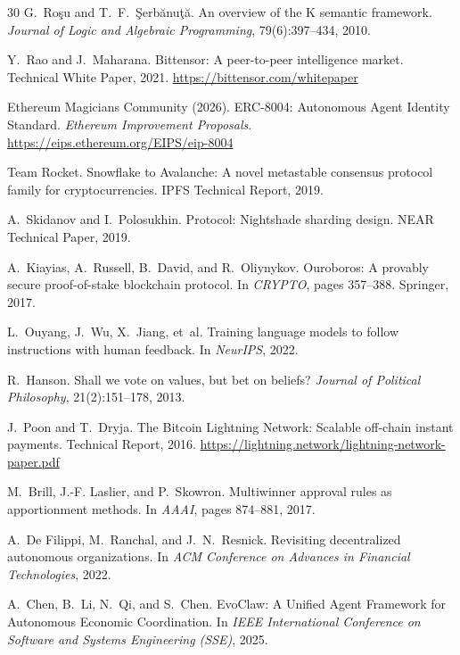 \documentclass[conference]{IEEEtran}
\begin{document}
\begin{thebibliography}{30}
G.~Ro\c{s}u and T.~F.~\c{S}erb\u{a}nu\c{t}\u{a}.
\newblock An overview of the {K} semantic framework.
\newblock \emph{Journal of Logic and Algebraic Programming}, 79(6):397--434, 2010.

Y.~Rao and J.~Maharana.
\newblock Bittensor: A peer-to-peer intelligence market.
\newblock Technical White Paper, 2021.
\newblock \url{https://bittensor.com/whitepaper}

Ethereum Magicians Community (2026).
\newblock ERC-8004: Autonomous Agent Identity Standard.
\newblock \textit{Ethereum Improvement Proposals}.
\newblock \url{https://eips.ethereum.org/EIPS/eip-8004}

Team Rocket.
\newblock Snowflake to Avalanche: A novel metastable consensus protocol family for cryptocurrencies.
\newblock IPFS Technical Report, 2019.

A.~Skidanov and I.~Polosukhin.
 Protocol: Nightshade sharding design.
\newblock NEAR Technical Paper, 2019.

A.~Kiayias, A.~Russell, B.~David, and R.~Oliynykov.
\newblock Ouroboros: A provably secure proof-of-stake blockchain protocol.
\newblock In \emph{CRYPTO}, pages 357--388. Springer, 2017.

L.~Ouyang, J.~Wu, X.~Jiang, et~al.
\newblock Training language models to follow instructions with human feedback.
\newblock In \emph{NeurIPS}, 2022.

R.~Hanson.
\newblock Shall we vote on values, but bet on beliefs?
\newblock \emph{Journal of Political Philosophy}, 21(2):151--178, 2013.

J.~Poon and T.~Dryja.
\newblock The {Bitcoin} Lightning Network: Scalable off-chain instant payments.
\newblock Technical Report, 2016.
\newblock \url{https://lightning.network/lightning-network-paper.pdf}

M.~Brill, J.-F. Laslier, and P.~Skowron.
\newblock Multiwinner approval rules as apportionment methods.
\newblock In \emph{AAAI}, pages 874--881, 2017.

A.~De Filippi, M.~Ranchal, and J.~N.~Resnick.
\newblock Revisiting decentralized autonomous organizations.
\newblock In \emph{ACM Conference on Advances in Financial Technologies}, 2022.

A.~Chen, B.~Li, N.~Qi, and S.~Chen.
\newblock EvoClaw: A Unified Agent Framework for Autonomous Economic Coordination.
\newblock In \emph{IEEE International Conference on Software and Systems Engineering (SSE)}, 2025.

\end{thebibliography}
\end{document}
